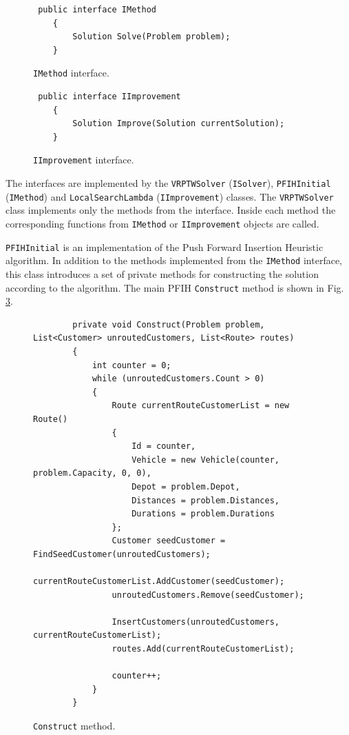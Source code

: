 \documentclass[a4paper,twoside,12pt]{book}
\begin{document}
\begin{figure}[htb]
\centering
\begin{lstlisting}
 public interface IMethod
    {
        Solution Solve(Problem problem);
    }
\end{lstlisting}
\caption{\lstinline{IMethod} interface.}
\label{fig:iMethod}
\end{figure}

\begin{figure}[htb]
\centering
\begin{lstlisting}
 public interface IImprovement
    {
        Solution Improve(Solution currentSolution);
    }
\end{lstlisting}
\caption{\lstinline{IImprovement} interface.}
\label{fig:iImprovement}
\end{figure}

The interfaces are implemented by the \lstinline{VRPTWSolver} (\lstinline{ISolver}), \lstinline{PFIHInitial} (\lstinline{IMethod}) and \lstinline{LocalSearchLambda} (\lstinline{IImprovement}) classes. The \lstinline{VRPTWSolver} class implements only the methods from the interface. Inside each method the corresponding functions from \lstinline{IMethod} or \lstinline{IImprovement} objects are called. 

\lstinline{PFIHInitial} is an implementation of the Push Forward Insertion Heuristic algorithm. In addition to the methods implemented from the \lstinline{IMethod} interface, this class introduces a set of private methods for constructing the solution according to the algorithm. The main PFIH \lstinline{Construct} method is shown in Fig. \ref{fig:construct}.

\begin{figure}
\centering
\begin{lstlisting}
        private void Construct(Problem problem, List<Customer> unroutedCustomers, List<Route> routes)
        {
            int counter = 0;
            while (unroutedCustomers.Count > 0)
            {
                Route currentRouteCustomerList = new Route()
                {
                    Id = counter,
                    Vehicle = new Vehicle(counter, problem.Capacity, 0, 0),
                    Depot = problem.Depot,
                    Distances = problem.Distances,
                    Durations = problem.Durations
                };
                Customer seedCustomer = FindSeedCustomer(unroutedCustomers);
                currentRouteCustomerList.AddCustomer(seedCustomer);
                unroutedCustomers.Remove(seedCustomer);

                InsertCustomers(unroutedCustomers, currentRouteCustomerList);
                routes.Add(currentRouteCustomerList);

                counter++;
            }
        }
\end{lstlisting}
\caption{\lstinline{Construct} method.}
\label{fig:construct}
\end{figure}
\end{document}
